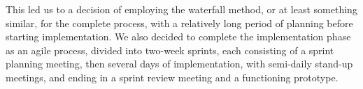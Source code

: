 This led us to a decision of employing the waterfall method, or at least something similar, for the complete process, with a relatively long period of planning before starting implementation. We also decided to complete the implementation phase as an agile process, divided into two-week sprints, each consisting of a sprint planning meeting, then several days of implementation, with semi-daily stand-up meetings, and ending in a sprint review meeting and a functioning prototype.
